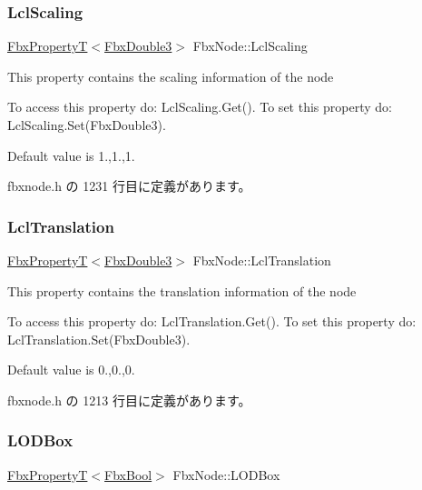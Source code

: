 \subsubsection{\texorpdfstring{Lcl\+Scaling}{LclScaling}}
{\footnotesize\ttfamily \hyperlink{class_fbx_property_t}{Fbx\+PropertyT}$<$\hyperlink{fbxtypes_8h_ae0a96f14cde566774c7553aa7523b7a7}{Fbx\+Double3}$>$ Fbx\+Node\+::\+Lcl\+Scaling}

This property contains the scaling information of the node

To access this property do\+: Lcl\+Scaling.\+Get(). To set this property do\+: Lcl\+Scaling.\+Set(\+Fbx\+Double3).

Default value is 1.,1.,1. 

 fbxnode.\+h の 1231 行目に定義があります。

\mbox{\label{class_fbx_node_a949dfdc30869095ed26efa68674a9142}} 
\subsubsection{\texorpdfstring{Lcl\+Translation}{LclTranslation}}
{\footnotesize\ttfamily \hyperlink{class_fbx_property_t}{Fbx\+PropertyT}$<$\hyperlink{fbxtypes_8h_ae0a96f14cde566774c7553aa7523b7a7}{Fbx\+Double3}$>$ Fbx\+Node\+::\+Lcl\+Translation}

This property contains the translation information of the node

To access this property do\+: Lcl\+Translation.\+Get(). To set this property do\+: Lcl\+Translation.\+Set(\+Fbx\+Double3).

Default value is 0.,0.,0. 

 fbxnode.\+h の 1213 行目に定義があります。

\mbox{\label{class_fbx_node_a7f622a4a695494b60221268ec33f54cb}} 
\subsubsection{\texorpdfstring{L\+O\+D\+Box}{LODBox}}
{\footnotesize\ttfamily \hyperlink{class_fbx_property_t}{Fbx\+PropertyT}$<$\hyperlink{fbxtypes_8h_a92e0562b2fe33e76a242f498b362262e}{Fbx\+Bool}$>$ Fbx\+Node\+::\+L\+O\+D\+Box}

